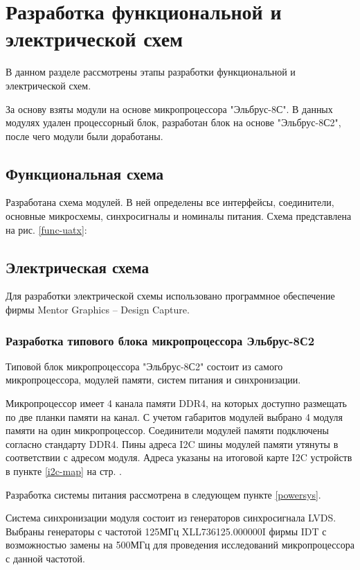\section{Разработка функциональной и электрической схем}

В данном разделе рассмотрены этапы разработки функциональной и электрической схем.

За основу взяты модули на основе микропроцессора "Эльбрус-8С". В данных модулях удален процессорный блок, разработан блок на основе "Эльбрус-8С2", после чего модули были доработаны.

\subsection{Функциональная схема}
Разработана схема модулей. В ней определены все интерфейсы, соединители, основные микросхемы, синхросигналы и номиналы питания. Схема представлена на рис. \ref{func-uatx}:


\subsection{Электрическая схема}

Для разработки электрической схемы использовано программное обеспечение фирмы Mentor Graphics -- Design Capture. 

\subsubsection{Разработка типового блока микропроцессора Эльбрус-8С2}

Типовой блок микропроцессора "Эльбрус-8С2" состоит из самого микропроцессора, модулей памяти, систем питания и синхронизации.

Микропроцессор имеет 4 канала памяти DDR4, на которых доступно размещать по две планки памяти на канал. С учетом габаритов модулей выбрано 4 модуля памяти на один микропроцессор. Соединители модулей памяти подключены согласно стандарту DDR4. Пины адреса I2C шины модулей памяти утянуты в соответствии с адресом модуля. Адреса указаны на итоговой карте I2C устройств в пункте \ref{i2c-map} на стр. \pageref{i2c-map}.

Разработка системы питания рассмотрена в следующем пункте \ref{powersys}.

Система синхронизации модуля состоит из генераторов синхросигнала LVDS. Выбраны генераторы с частотой 125МГц XLL736125.000000I фирмы IDT с возможностью замены на 500МГц для проведения исследований микропроцессора с данной частотой.

